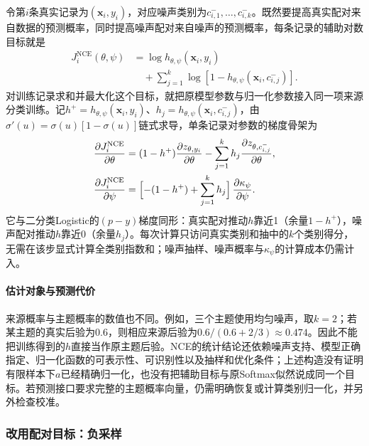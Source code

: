 令第$i$条真实记录为$(\bm x_i,y_i)$，对应噪声类别为$c^-_{i,1},\ldots,c^-_{i,k}$。既然要提高真实配对来自数据的预测概率，同时提高噪声配对来自噪声的预测概率，每条记录的辅助对数目标就是
\begin{equation}
  \label{eq:classification-nce-objective}
  \begin{aligned}
    J_i^{\mathrm{NCE}}(\theta,\psi)
      &=\log h_{\theta,\psi}(\bm x_i,y_i)\\
      &\quad+\sum_{j=1}^{k}
        \log[1-h_{\theta,\psi}(\bm x_i,c^-_{i,j})].
  \end{aligned}
\end{equation}
对训练记录求和并最大化这个目标，就把原模型参数与归一化参数接入同一项来源分类训练。记$h^+=h_{\theta,\psi}(\bm x_i,y_i)$、$h_j=h_{\theta,\psi}(\bm x_i,c^-_{i,j})$，由$\sigma'(u)=\sigma(u)[1-\sigma(u)]$链式求导，单条记录对参数的梯度骨架为
\[
  \begin{aligned}
    \frac{\partial J_i^{\mathrm{NCE}}}{\partial\theta}
      &=(1-h^+)\frac{\partial z_{\theta,y_i}}{\partial\theta}
        -\sum_{j=1}^{k}h_j\frac{\partial z_{\theta,c^-_{i,j}}}{\partial\theta},\\
    \frac{\partial J_i^{\mathrm{NCE}}}{\partial\psi}
      &=\Bigl[-(1-h^+)+\sum_{j=1}^{k}h_j\Bigr]\,
        \frac{\partial\kappa_{\psi}}{\partial\psi}.
  \end{aligned}
\]
它与二分类Logistic的$(p-y)$梯度同形：真实配对推动$h$靠近1（余量$1-h^+$），噪声配对推动$h$靠近0（余量$h_j$）。每次计算只访问真实类别和抽中的$k$个类别得分，无需在该步显式计算全类别指数和；噪声抽样、噪声概率与$\kappa_{\psi}$的计算成本仍需计入。

\paragraph{估计对象与预测代价}
来源概率与主题概率的数值也不同。例如，三个主题使用均匀噪声，取$k=2$；若某主题的真实后验为$0.6$，则相应来源后验为$0.6/(0.6+2/3)\approx0.474$。因此不能把训练得到的$h$直接当作原主题后验。NCE的统计结论还依赖噪声支持、模型正确指定、归一化函数的可表示性、可识别性以及抽样和优化条件；上述构造没有证明有限样本下$a$已经精确归一化，也没有把辅助目标与原Softmax似然说成同一个目标。若预测接口要求完整的主题概率向量，仍需明确恢复或计算类别归一化，并另外检查校准。

\subsubsection{改用配对目标：负采样}

